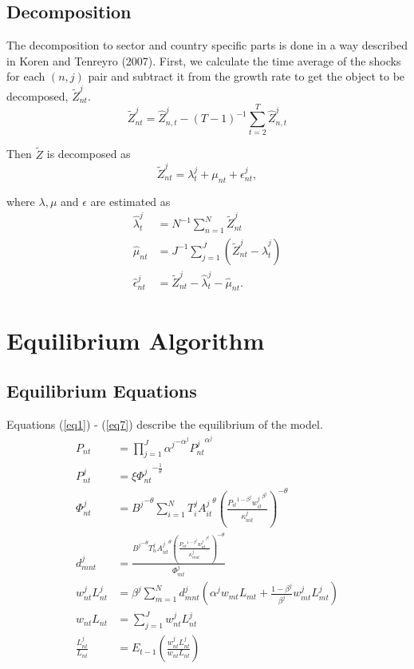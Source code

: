 \documentclass[11pt,oneside,a4paper]{article}
\begin{document}
\subsection{Decomposition}
The decomposition to sector and country specific parts is done in a way described in Koren and Tenreyro (2007). 
First, we calculate the time average of the shocks for each $(n,j)$ pair and subtract it from the growth rate to get the object to be decomposed, $\tilde{Z}^j_{nt}$.
$$\tilde{Z}^j_{nt} = \hat{Z}^j_{n,t} - (T - 1)^{-1} \sum_{t=2}^T \hat{Z}^j_{n,t}$$

Then $\tilde{Z}$ is decomposed as
$$\tilde{Z}^j_{nt} = \lambda^j_t + \mu_{nt} + \epsilon^j_{nt},$$

where $\lambda, \mu$ and $\epsilon$ are estimated as
\begin{align*}
\hat{\lambda}^j_t &= N^{-1} \sum_{n=1}^N  \tilde{Z}^j_{nt} \\
\hat{\mu}_{nt} &= J^{-1} \sum_{j=1}^J \left(\tilde{Z}^j_{nt} - \hat{\lambda}^j_t\right)\\
\hat{\epsilon}^j_{nt} &= \tilde{Z}^j_{nt} - \hat{\lambda}^j_t - \hat{\mu}_{nt}.
\end{align*}

\newpage
\section{Equilibrium Algorithm}
%
\subsection{Equilibrium Equations}
Equations (\ref{eq1}) - (\ref{eq7}) describe the equilibrium of the model.
\begin{align}
  P_{nt} &= \prod_{j = 1}^J {\alpha^j}^{- \alpha^j} {P_{nt}^j}^{\alpha^j} \label{eq1}\\
  P_{nt}^j &= \xi {\Phi_{nt}^j}^{-\frac{1}{\theta}} \label{eq2}\\
  \Phi_{nt}^j &= {B^j}^{-\theta} \sum_{i = 1}^N T_i^j {A_{it}^j}^{\theta} \left(\frac{{P_{it}}^{1 - \beta^j} {w_{it}^j}^{\beta^j}}{\kappa_{nit}^j}\right)^{-\theta} \label{eq3}\\
  d_{mnt}^j &= \frac{{B^j}^{-\theta} T_n^j {A_{nt}^j}^{\theta} \left(\frac{{P_{nt}}^{1 - \beta^j} {w_{nt}^j}^{\beta^j}}{\kappa_{mnt}^j}\right)^{-\theta}} {\Phi_{mt}^j} \label{eq4}\\
  w_{nt}^j L_{nt}^j &= \beta^j \sum_{m = 1}^N d_{mnt}^j \left( \alpha^j w_{mt} L_{mt} + \frac{1 - \beta^j}{\beta^j} w_{mt}^j L_{mt}^j\right) \label{eq5}\\
  w_{nt} L_{nt} &= \sum_{j = 1}^J w_{nt}^j L_{nt}^j \label{eq6}\\
  \frac{L_{nt}^{j}}{L_{nt}} &= E_{t - 1} \left( \frac{w_{nt}^j L_{nt}^j}{w_{nt} L_{nt}}\right) \label{eq7}
\end{align}
\end{document}
